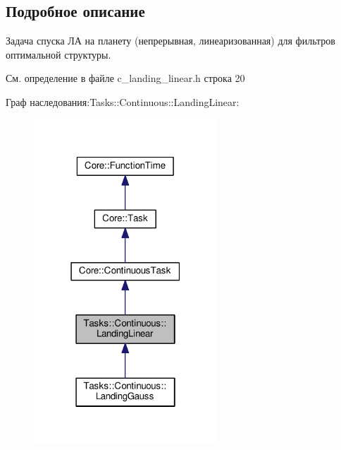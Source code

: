 \subsection{Подробное описание}
Задача спуска ЛА на планету (непрерывная, линеаризованная) для фильтров оптимальной структуры. 

См. определение в файле c\+\_\+landing\+\_\+linear.\+h строка 20



Граф наследования\+:Tasks\+:\+:Continuous\+:\+:Landing\+Linear\+:
\nopagebreak
\begin{figure}[H]
\begin{center}
\leavevmode
\includegraphics[width=195pt]{class_tasks_1_1_continuous_1_1_landing_linear__inherit__graph}
\end{center}
\end{figure}


